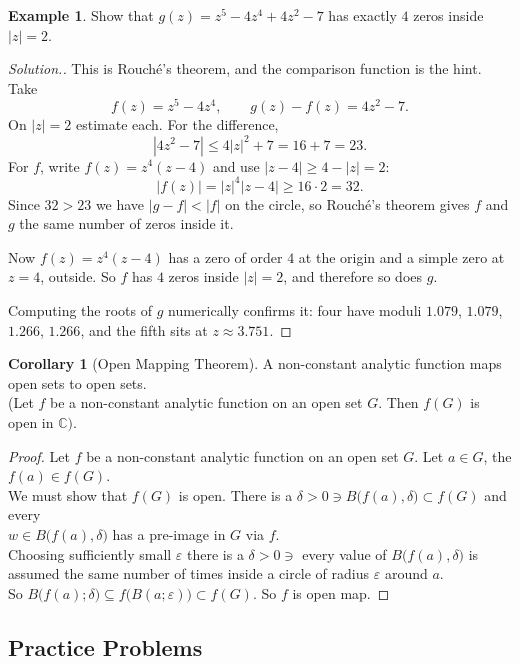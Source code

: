 \documentclass[11pt,a4paper]{article}
\theoremstyle{definition}
\newtheorem{example}[thm]{Example}
\newtheorem{corollary}[thm]{Corollary}
\newenvironment{solution}
  {\renewcommand{\qedsymbol}{}\begin{proof}[\textit{Solution}.]}
  {\end{proof}}
\begin{document}
\begin{example}
Show that $g(z) = z^5 - 4z^4 + 4z^2 - 7$ has exactly $4$ zeros inside
$\left|z\right| = 2$.
\end{example}
\begin{solution}
This is Rouch\'e's theorem, and the comparison function is the hint. Take
$$f(z)=z^5-4z^4,\qquad g(z)-f(z)=4z^2-7 .$$
On $\left|z\right|=2$ estimate each. For the difference,
$$\left|4z^2-7\right|\leq 4\left|z\right|^2+7=16+7=23 .$$
For $f$, write $f(z)=z^4(z-4)$ and use $\left|z-4\right|\geq
4-\left|z\right|=2$:
$$\left|f(z)\right|=\left|z\right|^4\left|z-4\right|\geq 16\cdot 2=32 .$$
Since $32>23$ we have $\left|g-f\right|<\left|f\right|$ on the circle, so
Rouch\'e's theorem gives $f$ and $g$ the same number of zeros inside it.

Now $f(z)=z^4(z-4)$ has a zero of order $4$ at the origin and a simple zero at
$z=4$, outside. So $f$ has $4$ zeros inside $\left|z\right|=2$, and therefore so
does $g$.

Computing the roots of $g$ numerically confirms it: four have moduli $1.079$,
$1.079$, $1.266$, $1.266$, and the fifth sits at $z\approx 3.751$.
\end{solution}

\begin{corollary}[Open Mapping Theorem]
A non-constant analytic function maps open sets to open sets.\\
(Let $f$ be a non-constant analytic function on an open set $G$. Then $f(G)$ is open in $\mathbb{C})$.
\end{corollary}

\begin{proof}
Let $f$ be a non-constant analytic function on an open set $G$. Let $a\in G$, the $f(a)\in f(G)$.\\
We must show that $f(G)$ is open. There is  a $\delta > 0 \ni B\big(f(a),\delta\big) \subset f(G)$ and every\\ $w\in B\big(f(a),\delta\big)$ has a pre-image in $G$ via $f$.\\
Choosing sufficiently small $\varepsilon$ there is a $\delta > 0 \ni $ every value of $B\big(f(a),\delta\big)$ is assumed the same number of times inside a circle of radius $\varepsilon$ around $a$.\\
So $B\big(f(a);\delta\big)\subseteq f\big(B(a;\varepsilon)\big) \subset f(G)$. So $f$ is open map.
\end{proof}

{\color[wave]{485}\subsection{Practice Problems}}
\end{document}
